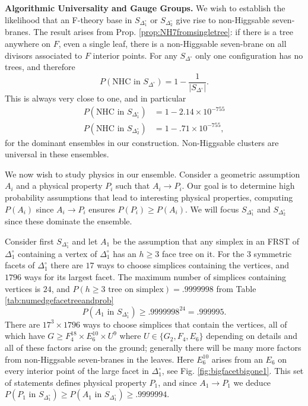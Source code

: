 \documentclass[aps,prl,twocolumn, superscriptaddress,groupedaddress,nofootinbib]{revtex4-1}
\newcommand{\sdoc}{S_{\Delta_1^\circ}}
\newcommand{\sdtc}{S_{\Delta_2^\circ}}
\newcommand{\doc}{{\Delta_1^\circ}}
\newcommand{\textin}{\,\, \text{in} \,\,}
\begin{document}
\vspace{.2cm}
\noindent \textbf{Algorithmic Universality and Gauge Groups.} We wish to establish
the likelihood that an F-theory base in $\sdoc$ or $\sdtc$ give rise to
non-Higgsable seven-branes. The result arises from Prop. \ref{prop:NH7fromsingletree}:
if there is a tree anywhere on $F$, even a single leaf, there is a
non-Higgsable seven-brane on all divisors associated to $F$ interior points.
For any $S_{\Delta^\circ}$ only one configuration has no trees, and therefore
\begin{equation}
P(\text{NHC in } S_{\Delta^\circ}) = 1 - \frac{1}{|S_{\Delta^\circ}|}.
\end{equation}
This is always very close to one, and in particular
\begin{align}
P(\text{NHC in } \sdoc) &= 1-2.14\times 10^{-755} \nonumber \\
P(\text{NHC in } \sdtc) &= 1-.71\times 10^{-755},
\end{align}
for the dominant ensembles in our construction. Non-Higgsable clusters are universal in these ensembles.

We now wish to study physics in
our ensemble. Consider a geometric assumption $A_i$
and a physical property $P_i$ such that $A_i\to P_i$. Our goal is to determine high
probability assumptions that lead to interesting physical properties, computing $P(A_i)$
since $A_i\to P_i$ ensures $P(P_i)\geq P(A_i).$ We will focus $\sdoc$ and $\sdtc$ since
these dominate the ensemble.

Consider first $\sdoc$ and let $A_1$ be the assumption that any simplex in an FRST 
of $\doc$ containing a vertex of $\doc$ has an $h\geq 3$ face tree on it. 
For the $3$ symmetric facets of $\doc$ there are $17$ ways to choose simplices
containing the vertices, and $1796$ ways for its largest facet. The maximum
number of simplices containing vertices is $24$, and $P(h\geq 3 \,\, \text{tree on simplex}) = .9999998$ from Table \ref{tab:numedgefacetreeandprob}
\begin{equation}
P(A_1\textin\sdoc)\geq .9999998^{24}=.999995.
\end{equation}
There are $17^3\times1796$ ways to choose simplices that contain the vertices,
all of which have $G\geq F_4^{18}\times E_6^{10}\times U^9$ where 
$U\in\{G_2,F_4,E_6\}$ depending on details and all of these factors arise on
the ground; generally there will be many more factors from non-Higgsable seven-branes
in the leaves. Here $E_6^{10}$ arises from an $E_6$ on every interior point
of the large facet in $\doc$, see Fig. \ref{fig:bigfacetbigone1}. This set of
statements defines physical property $P_1$, and since $A_1\to P_1$
we deduce $P(P_1\textin \sdoc)\geq P(A_1\textin \sdoc) \geq .9999994$.
\end{document}
